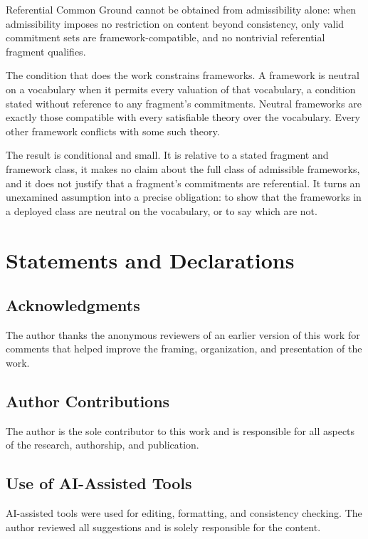 \documentclass[11pt]{article}
\theoremstyle{plain}
\theoremstyle{definition}
\theoremstyle{remark}
\begin{document}
Referential Common Ground cannot be obtained from admissibility alone: when
admissibility imposes no restriction on content beyond consistency, only valid
commitment sets are framework-compatible, and no nontrivial referential
fragment qualifies.

The condition that does the work constrains frameworks.
A framework is neutral on a vocabulary when it permits every valuation of that
vocabulary, a condition stated without reference to any fragment's commitments.
Neutral frameworks are exactly those compatible with every satisfiable theory
over the vocabulary.
Every other framework conflicts with some such theory.

The result is conditional and small.
It is relative to a stated fragment and framework class, it makes no claim about
the full class of admissible frameworks, and it does not justify that a
fragment's commitments are referential.
It turns an unexamined assumption into a precise obligation: to show that the
frameworks in a deployed class are neutral on the vocabulary, or to say which
are not.


\section*{Statements and Declarations}

\subsection*{Acknowledgments} The author thanks the anonymous reviewers
of an earlier version of this work for comments that helped improve
the framing, organization, and presentation of the work.

\subsection*{Author Contributions}
The author is the sole contributor to this work and
is responsible for all aspects of the research, authorship, and publication.

\subsection*{Use of AI-Assisted Tools}
AI-assisted tools were used for editing, formatting, and consistency checking.
The author reviewed all suggestions and is solely responsible for the content.
\end{document}
